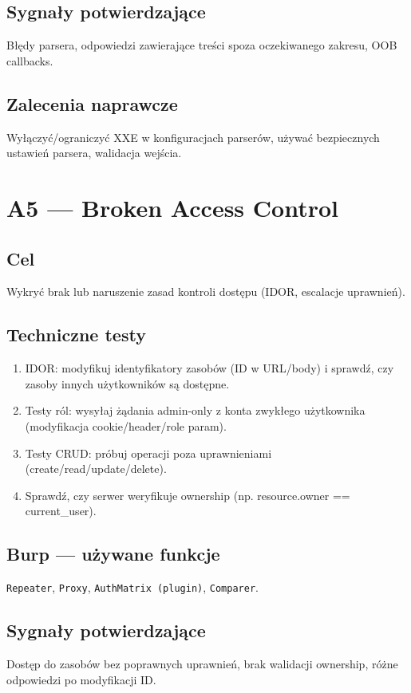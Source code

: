 \documentclass[11pt,a4paper]{article}
\begin{document}
	\subsection*{Sygnały potwierdzające}
	Błędy parsera, odpowiedzi zawierające treści spoza oczekiwanego zakresu, OOB callbacks.
	
	\subsection*{Zalecenia naprawcze}
	Wyłączyć/ograniczyć XXE w konfiguracjach parserów, używać bezpiecznych ustawień parsera, walidacja wejścia.
	
	\newpage
	\section{A5 --- Broken Access Control}
	\subsection*{Cel}
	Wykryć brak lub naruszenie zasad kontroli dostępu (IDOR, escalacje uprawnień).
	
	\subsection*{Techniczne testy}
	\begin{enumerate}[leftmargin=*,label=\arabic*)]
		\item IDOR: modyfikuj identyfikatory zasobów (ID w URL/body) i sprawdź, czy zasoby innych użytkowników są dostępne.
		\item Testy ról: wysyłaj żądania admin-only z konta zwykłego użytkownika (modyfikacja cookie/header/role param).
		\item Testy CRUD: próbuj operacji poza uprawnieniami (create/read/update/delete).
		\item Sprawdź, czy serwer weryfikuje ownership (np. resource.owner == current\_user).
	\end{enumerate}
	
	\subsection*{Burp --- używane funkcje}
	\texttt{Repeater}, \texttt{Proxy}, \texttt{AuthMatrix (plugin)}, \texttt{Comparer}.
	
	\subsection*{Sygnały potwierdzające}
	Dostęp do zasobów bez poprawnych uprawnień, brak walidacji ownership, różne odpowiedzi po modyfikacji ID.
	
\end{document}
